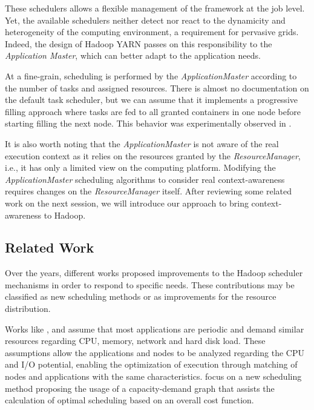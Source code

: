 These schedulers allows a flexible management of the framework at the job level. Yet, the available schedulers neither detect nor react to the dynamicity and heterogeneity of the computing environment, a requirement for pervasive grids. Indeed, the design of Hadoop YARN passes on this responsibility to the \textit{Application Master}, which can better adapt to the application needs.

At a fine-grain, scheduling is performed by the \textit{ApplicationMaster} according to the number of tasks and assigned resources. There is almost no documentation on the default task scheduler, but we can assume that it implements a progressive filling approach where tasks are fed to all granted containers in one node before starting filling the next node. This behavior was experimentally observed in \cite{UBICOMM2014}. 

It is also worth noting that the \textit{ApplicationMaster} is not aware of the real execution context as it relies on the resources granted by the \textit{ResourceManager}, i.e., it has only a limited view on the computing platform. Modifying the \textit{ApplicationMaster} scheduling algorithms to consider real context-awareness requires changes on the \textit{ResourceManager} itself. After reviewing some related work on the next session, we will introduce our approach to bring context-awareness to Hadoop.


\subsection{Related Work} \label{sec:related}

Over the years, different works proposed improvements to the Hadoop scheduler mechanisms in order to respond to specific needs. These contributions may be classified as new scheduling methods or as improvements for the resource distribution.

Works like \cite{Kumar2012}, \cite{Tian2009} and \cite{Rasooli2012} assume that most applications are periodic and demand similar resources regarding CPU, memory, network and hard disk load. These assumptions allow the applications and nodes to be analyzed regarding the CPU and I/O potential, enabling the optimization of  execution through matching of nodes and applications with the same characteristics. \cite{Isard2009} focus on a new scheduling method proposing the usage of a capacity-demand graph that assists the calculation of optimal scheduling based on an overall cost function.

